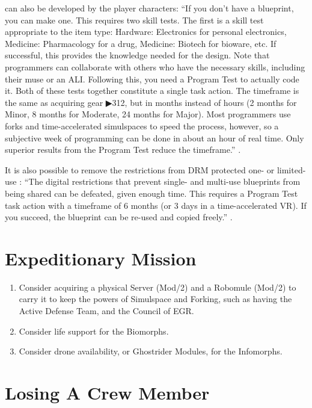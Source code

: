 \begin{enumerate}
     can also be developed by the player characters: “If you don’t have a blueprint, you can make one. This requires two skill tests. The first is a skill test appropriate to the item type: Hardware: Electronics for personal electronics, Medicine: Pharmacology for a drug, Medicine: Biotech for bioware, etc. If successful, this provides the knowledge needed for the design. Note that programmers can collaborate with others who have the necessary skills, including their muse or an ALI. Following this, you need a Program Test to actually code it. Both of these tests together constitute a single task action. The timeframe is the same as acquiring gear ▶312, but in months instead of hours (2 months for Minor, 8 months for Moderate, 24 months for Major). Most programmers use forks and time-accelerated simulspaces to speed the process, however, so a subjective week of programming can be done in about an hour of real time. Only superior results from the Program Test reduce the timeframe.” \citep[pg. 314]{ep2e_1.1_2019}.

    It is also possible to remove the restrictions from DRM protected one- or limited-use : “The digital restrictions that prevent single- and multi-use blueprints from being shared can be defeated, given enough time. This requires a Program Test task action with a timeframe of 6 months (or 3 days in a time-accelerated VR). If you succeed, the blueprint can be re-used and copied freely.” \citep[pg. 314]{ep2e_1.1_2019}.
\end{enumerate}


\section{Expeditionary Mission}

\begin{enumerate}
    \item Consider acquiring a physical \gls{Server} (Mod/2) \citep[pg. 337]{ep2e_1.1_2019} and a \gls{Robomule} (Mod/2) \citep[pg. 349]{ep2e_1.1_2019} to carry it to keep the powers of \gls{Simulspace} and \gls{Forking}, such as having the \gls{Active Defense} Team, and the Council of EGR.
    \item Consider life support for the Biomorphs.
    \item Consider drone availability, or \glspl{Ghostrider Module}, for the Infomorphs.
\end{enumerate}


\section{Losing A Crew Member}

